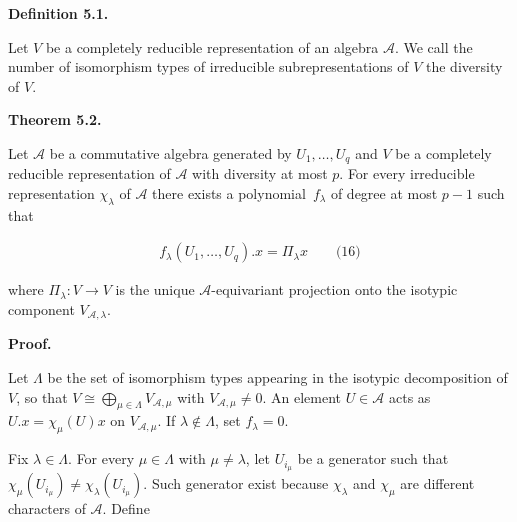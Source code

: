 \documentclass[10pt,a4paper]{article}
\begin{document}
\par\medskip\noindent\textbf{Definition 5.1.}\par



Let $V$ be a completely reducible representation of an algebra $\mathcal{A}$.
We call the number of isomorphism types of irreducible subrepresentations of $V$ the diversity of $V$.






\par\medskip\noindent\textbf{Theorem 5.2.}\par



Let $\mathcal{A}$ be a commutative algebra generated by $U_{1},\dots,U_{q}$ and $V$ be a completely reducible representation of $\mathcal{A}$ with diversity at most $p$.
For every irreducible representation $\chi_{\lambda}$ of $\mathcal{A}$ there exists a polynomial $f_{\lambda}$ of degree at most $p-1$ such that



\[\begin{aligned}
\displaystyle f_{\lambda}(U_{1},\dots,U_{q}).x=\Pi_{\lambda}x\qquad\text{(16)}
\end{aligned}\]


where $\Pi_{\lambda}\colon V\to V$ is the unique $\mathcal{A}$-equivariant projection onto the isotypic component $V_{\mathcal{A},\lambda}$.






\par\medskip\noindent\textbf{Proof.}\par




Let $\Lambda$ be the set of isomorphism types appearing in the isotypic decomposition of $V$, so that $V\cong\bigoplus_{\mu\in\Lambda}V_{\mathcal{A},\mu}$ with $V_{\mathcal{A},\mu}\neq 0$. An element $U\in\mathcal{A}$ acts as $U.x=\chi_{\mu}(U)x$ on $V_{\mathcal{A},\mu}$. If $\lambda\notin\Lambda$, set $f_{\lambda}=0$.





Fix $\lambda\in\Lambda$. For every $\mu\in\Lambda$ with $\mu\neq\lambda$, let $U_{i_{\mu}}$ be a generator such that $\chi_{\mu}(U_{i_{\mu}})\neq\chi_{\lambda}(U_{i_{\mu}})$. Such generator exist because $\chi_{\lambda}$ and $\chi_{\mu}$ are different characters of $\mathcal{A}$. Define
\end{document}
